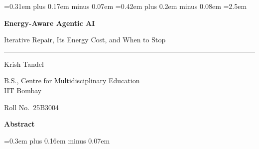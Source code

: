 \documentclass[11pt,a4paper]{article}
\begin{document}
\spaceskip=0.31em plus 0.17em minus 0.07em
\xspaceskip=0.42em plus 0.2em minus 0.08em
\emergencystretch=2.5em

\begin{titlepage}
\centering
\vspace*{1.2cm}
{\sffamily\bfseries\fontsize{30}{36}\selectfont\color{ink} Energy-Aware Agentic AI\par}
\vspace{10pt}
{\sffamily\fontsize{17}{22}\selectfont\color{accent} Iterative Repair, Its Energy Cost, and When to Stop\par}
\vspace{0.9cm}
{\color{accent}\rule{0.35\textwidth}{0.8pt}\par}
\vspace{0.9cm}
{\Large Krish Tandel\par}
\vspace{8pt}
{\large B.S., Centre for Multidisciplinary Education\\[3pt] IIT Bombay\par}
\vspace{8pt}
{\large Roll No.\ 25B3004\par}
\vfill
\begin{tcolorbox}[enhanced,colback=boxbg,colframe=boxbg,arc=0pt,left=14pt,right=14pt,top=10pt,bottom=10pt,width=\textwidth]
\raggedright
{\sffamily\bfseries\large\color{accent} Abstract}\par\medskip
\small\linespread{1.15}\selectfont\spaceskip=0.3em plus 0.16em minus 0.07em 

\end{tcolorbox}
\end{titlepage}
\end{document}

